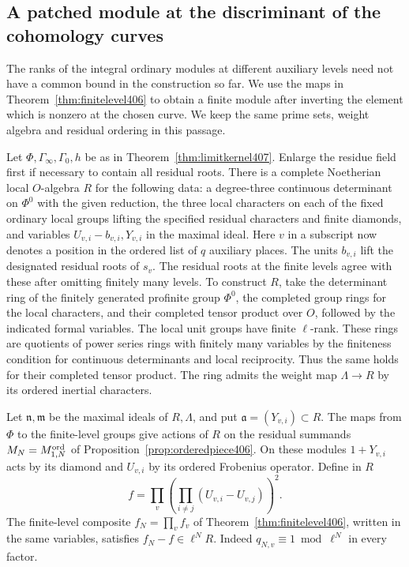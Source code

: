 \documentclass[a4paper,11pt]{article}
\theoremstyle{definition}
\theoremstyle{remark}
\numberwithin{equation}{section}
\begin{document}
\subsection{A patched module at the discriminant of the cohomology curves}
\label{sec:patchcomparison408}

The ranks of the integral ordinary modules at different
auxiliary levels need not have a common bound in the
construction so far. We use the maps in
Theorem~\ref{thm:finitelevel406} to obtain a finite module
after inverting the element which is nonzero at the chosen
curve. We keep the same prime sets, weight algebra and
residual ordering in this passage.

Let \(\Phi,\Gamma_\infty,\Gamma_0,h\) be as in
Theorem~\ref{thm:limitkernel407}. Enlarge the residue field
first if necessary to contain all residual roots. There
is a complete Noetherian local \(O\)-algebra \(R\) for the
following data: a degree-three continuous determinant on
\(\Phi^0\) with the given reduction, the three local characters
on each of the fixed ordinary local groups lifting the
specified residual characters and finite diamonds, and
variables \(U_{v,i}-b_{v,i},Y_{v,i}\) in the maximal ideal.
Here \(v\) in a subscript now denotes a position in the
ordered list of \(q\) auxiliary places. The units \(b_{v,i}\)
lift the designated residual roots of \(s_v\). The residual
roots at the finite levels agree with these after omitting
finitely many levels. To construct \(R\), take the
determinant ring of the finitely generated profinite group
\(\Phi^0\), the completed group rings for the local characters,
and their completed tensor product over \(O\), followed by
the indicated formal variables. The local unit groups have
finite \(\ell\)-rank. These rings are quotients of power
series rings with finitely many variables by the finiteness
condition for continuous determinants and local reciprocity.
Thus the same holds for their completed tensor product.
The ring admits the weight map \(\Lambda\to R\) by its
ordered inertial characters. \cite{VIII-VI-chenevier364}

Let \(\mathfrak n,\mathfrak m\) be the maximal ideals of
\(R,\Lambda\), and put \(\mathfrak a=(Y_{v,i})\subset R\).
The maps from \(\Phi\) to the finite-level groups give
actions of \(R\) on the residual summands
\(M_N=M_{1,N}^{\rm ord}\) of Proposition~\ref{prop:orderedpiece406}.
On these modules \(1+Y_{v,i}\) acts by its diamond and
\(U_{v,i}\) by its ordered Frobenius operator. Define in \(R\)
\[
        f=\prod_{v}\left(\prod_{i\ne j}(U_{v,i}-U_{v,j})\right)^2 .
\]
The finite-level composite \(f_N=\prod_v f_v\) of
Theorem~\ref{thm:finitelevel406}, written in the same variables,
satisfies \(f_N-f\in\ell^N R\). Indeed \(q_{N,v}\equiv1\bmod
\ell^N\) in every factor.
\end{document}
